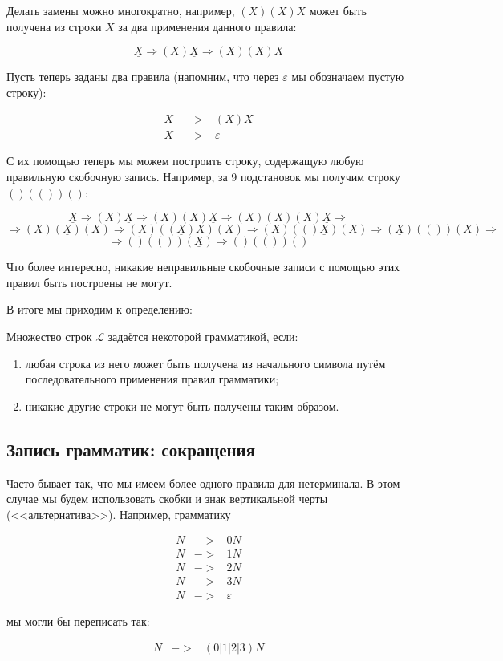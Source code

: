 \documentclass[12pt]{article}
\begin{document}
Делать замены можно многократно, например, 
$(X)(X)X$ может быть получена из строки $X$ за два применения данного правила:

$$\underline{X} \Rightarrow (X)\underline{X} \Rightarrow (X)(X)X $$

Пусть теперь заданы два правила (напомним, что через $\varepsilon$ мы обозначаем пустую строку):
\begin{bnf}\begin{eqnarray*}
X &->& (X)X\\
X &->& \varepsilon
\end{eqnarray*}\end{bnf}%
С их помощью теперь мы можем построить строку, содержащую любую правильную скобочную
запись. Например, за 9 подстановок мы получим строку $()(())()$:

$$\underline{X} \Rightarrow (X)\underline{X} \Rightarrow (X)(X)\underline{X} 
\Rightarrow (X)(X)(X)\underline{X} \Rightarrow$$
$$\Rightarrow (X)(\underline{X})(X) \Rightarrow (X)((\underline{X})X)(X) 
\Rightarrow (X)(()\underline{X})(X) \Rightarrow (\underline{X})(())(X) \Rightarrow$$
$$\Rightarrow ()(())(\underline{X}) \Rightarrow ()(())()$$

Что более интересно, никакие неправильные скобочные записи с помощью этих
правил быть построены не могут.

В итоге мы приходим к определению:
\begin{definition} Множество строк $\mathcal{L}$ задаётся некоторой грамматикой, если:
\begin{enumerate}
\item любая строка из него может быть получена из начального символа путём 
последовательного применения правил грамматики;
\item никакие другие строки не могут быть получены таким образом.
\end{enumerate}
\end{definition}

\subsection{Запись грамматик: сокращения}

Часто бывает так, что мы имеем более одного правила для нетерминала. 
В этом случае мы будем использовать скобки и знак вертикальной черты (<<альтернатива>>).
Например, грамматику 
\begin{bnf}\begin{eqnarray*}
N &->& 0N\\
N &->& 1N\\
N &->& 2N\\
N &->& 3N\\
N &->& \varepsilon
\end{eqnarray*}\end{bnf}
мы могли бы переписать так:
\begin{bnf}\begin{eqnarray*}
N &->& (0|1|2|3) N
\end{eqnarray*}\end{bnf}
\end{document}
